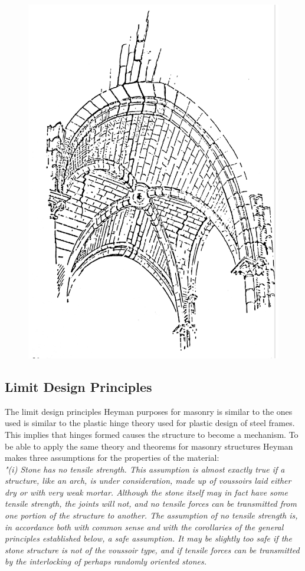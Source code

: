 \begin{figure}[H] 
\centering
\includegraphics[width=0.5\linewidth ]{figure/Theory/cracksHeyman.pdf}
\caption{\cite{ref:Heyman}}
\end{figure}

\subsection{Limit Design Principles} \label{sec:limit}

The limit design principles Heyman purposes for masonry is similar to the ones used is similar to the plastic hinge theory used for plastic design of steel frames. This implies that hinges formed causes the structure to become a mechanism. To be able to apply the same theory and theorems for masonry structures Heyman makes three assumptions for the properties of the material:\cite{ref:Heyman2}\\



\textit{"(i) Stone has no tensile strength. This assumption is almost exactly true if a structure,
like an arch, is under consideration, made up of voussoirs laid either dry or with very
weak mortar. Although the stone itself may in fact have some tensile strength, the joints
will not, and no tensile forces can be transmitted from one portion of the structure to
another. The assumption of no tensile strength is, in accordance both with common sense
and with the corollaries of the general principles established below, a safe assumption.
It may be slightly too safe if the stone structure is not of the voussoir type, and if tensile
forces can be transmitted by the interlocking of perhaps randomly oriented stones.}

